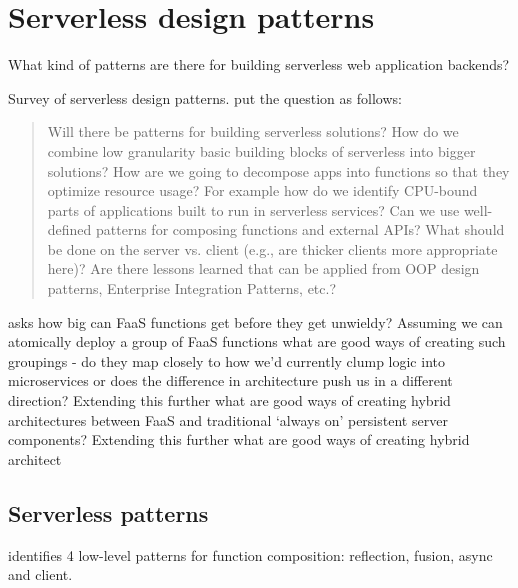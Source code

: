 \chapter{Serverless design patterns} \label{cha:patterns}

What kind of patterns are there for building serverless web application backends?

Survey of serverless design patterns. \textcite{baldini17currentTrends} put the question as follows:

\begin{quote}
Will there be patterns for building serverless solutions? How do we combine low granularity basic building blocks of serverless into bigger solutions? How are we going to decompose apps into functions so that they optimize resource usage? For example how do we identify CPU-bound parts of applications built to run in serverless services? Can we use well-defined patterns for composing functions and external APIs? What should be done on the server vs. client (e.g., are thicker clients more appropriate here)? Are there lessons learned that can be applied from OOP design patterns, Enterprise Integration Patterns, etc.?
\end{quote}

\textcite{robert2016serverlessarchitectures} asks how big can FaaS functions get before they get unwieldy? Assuming we can atomically deploy a group of FaaS functions what are good ways of creating such groupings - do they map closely to how we’d currently clump logic into microservices or does the difference in architecture push us in a different direction? Extending this further what are good ways of creating hybrid architectures between FaaS and traditional ‘always on’ persistent server components? Extending this further what are good ways of creating hybrid architect

\section{Serverless patterns} \label{sec:serverlessPatterns}


\textcite{baldini17trilemma} identifies 4 low-level patterns for function composition: reflection, fusion, async and client.

